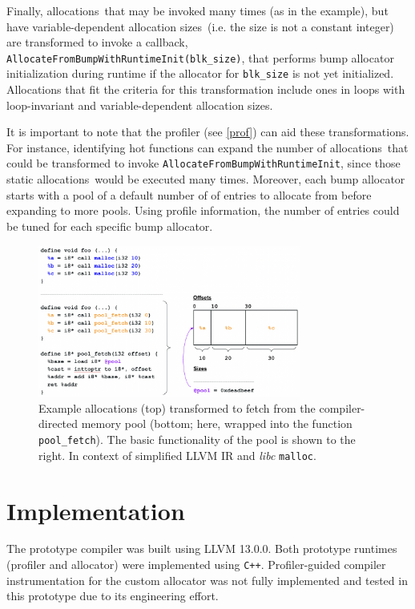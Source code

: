 \documentclass{article}
\def\ALLS{allocations}
\def\SIZES{allocation sizes}
\begin{document}
Finally, \ALLS\ that may be invoked many times (as in the example), but have 
variable-dependent \SIZES\ (i.e. the size is not a constant integer) are transformed to 
invoke a callback, \texttt{AllocateFromBumpWithRuntimeInit(blk\_size)}, that performs 
bump allocator initialization during runtime if the allocator for \texttt{blk\_size} is not
yet initialized. Allocations that fit the criteria for this transformation include ones
in loops with loop-invariant and variable-dependent \SIZES .

It is important to note that the profiler (see \ref{prof}) can aid these transformations.
For instance, identifying hot functions can expand the number of \ALLS\ that could
be transformed to invoke \texttt{AllocateFromBumpWithRuntimeInit}, since those static
\ALLS\ would be executed many times. Moreover, each bump allocator starts with a pool of 
a default number of of entries to allocate from before expanding to more pools. Using
profile information, the number of entries could be tuned for each specific bump allocator.

\begin{figure} [htp]
        \centering
        \includegraphics[width=0.77\textwidth]{figs/pool.png} 
        \caption{Example allocations (top) transformed to fetch from the compiler-directed
        memory pool (bottom; here, wrapped into the function \texttt{pool\_fetch}). The 
        basic functionality of the pool is shown to the right. In context of simplified LLVM 
        IR and \textit{libc} \texttt{malloc}.}  
	    \label{fig:pool}
\end{figure}

\section{Implementation}
The prototype compiler was built using LLVM 13.0.0. Both prototype runtimes (profiler and allocator) 
were implemented using \texttt{C++}. Profiler-guided compiler instrumentation for the custom 
allocator was not fully implemented and tested in this prototype due to its engineering effort.
\end{document}

